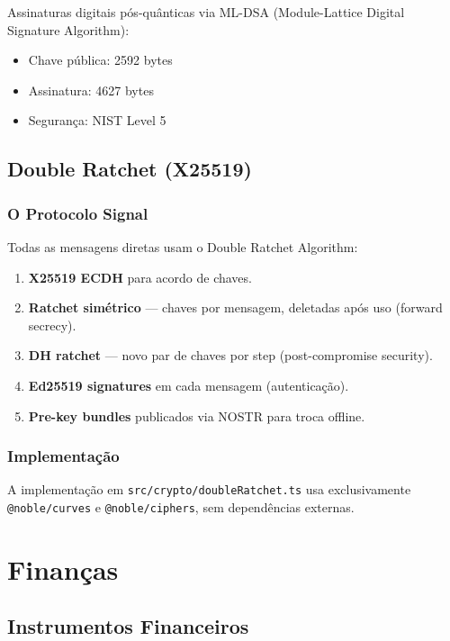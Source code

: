 \documentclass[12pt,a4paper,twoside]{book}
\theoremstyle{remark}
\begin{document}
Assinaturas digitais pós-quânticas via ML-DSA (Module-Lattice Digital Signature Algorithm):

\begin{itemize}
    \item Chave pública: 2592 bytes
    \item Assinatura: 4627 bytes
    \item Segurança: NIST Level 5
\end{itemize}

\chapter{Double Ratchet (X25519)}
\label{chap:doubleratchet}

\section{O Protocolo Signal}

Todas as mensagens diretas usam o Double Ratchet Algorithm:

\begin{enumerate}
    \item \textbf{X25519 ECDH} para acordo de chaves.
    \item \textbf{Ratchet simétrico} — chaves por mensagem, deletadas após uso (forward secrecy).
    \item \textbf{DH ratchet} — novo par de chaves por step (post-compromise security).
    \item \textbf{Ed25519 signatures} em cada mensagem (autenticação).
    \item \textbf{Pre-key bundles} publicados via NOSTR para troca offline.
\end{enumerate}

\section{Implementação}

A implementação em \texttt{src/crypto/doubleRatchet.ts} usa exclusivamente \texttt{@noble/curves} e \texttt{@noble/ciphers}, sem dependências externas.

\part{Finanças}

\chapter{Instrumentos Financeiros}
\label{chap:instrumentos}
\end{document}
